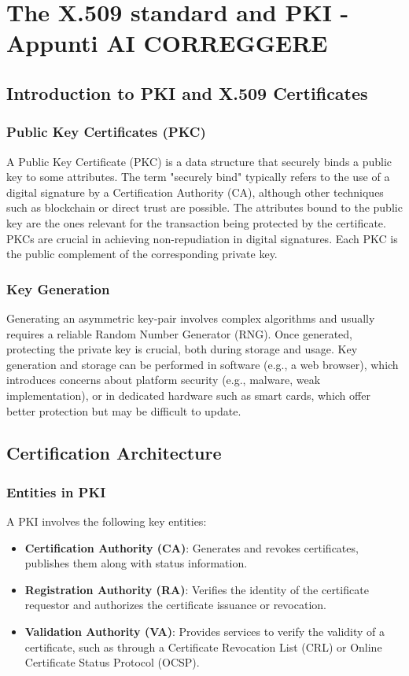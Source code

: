 \chapter{The X.509 standard and PKI - \textbf{Appunti AI CORREGGERE}}

\section{Introduction to PKI and X.509 Certificates}
\subsection{Public Key Certificates (PKC)}
A Public Key Certificate (PKC) is a data structure that securely binds a public key to some attributes. The term "securely bind" typically refers to the use of a digital signature by a Certification Authority (CA), although other techniques such as blockchain or direct trust are possible. The attributes bound to the public key are the ones relevant for the transaction being protected by the certificate. PKCs are crucial in achieving non-repudiation in digital signatures. Each PKC is the public complement of the corresponding private key.

\subsection{Key Generation}
Generating an asymmetric key-pair involves complex algorithms and usually requires a reliable Random Number Generator (RNG). Once generated, protecting the private key is crucial, both during storage and usage. Key generation and storage can be performed in software (e.g., a web browser), which introduces concerns about platform security (e.g., malware, weak implementation), or in dedicated hardware such as smart cards, which offer better protection but may be difficult to update.

\section{Certification Architecture}
\subsection{Entities in PKI}
A PKI involves the following key entities:
\begin{itemize}
    \item \textbf{Certification Authority (CA)}: Generates and revokes certificates, publishes them along with status information.
    \item \textbf{Registration Authority (RA)}: Verifies the identity of the certificate requestor and authorizes the certificate issuance or revocation.
    \item \textbf{Validation Authority (VA)}: Provides services to verify the validity of a certificate, such as through a Certificate Revocation List (CRL) or Online Certificate Status Protocol (OCSP).
\end{itemize}

